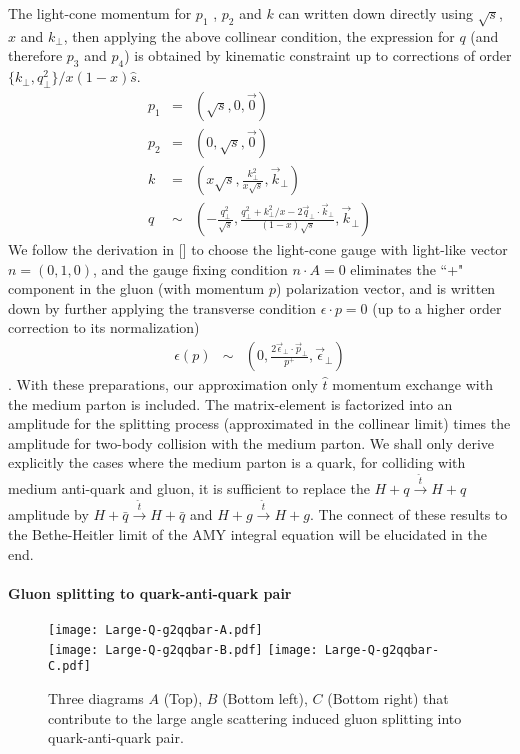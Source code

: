 The light-cone momentum for $p_1$ , $p_2$ and $k$ can written down directly using $\sqrt{s}$, $x$ and $k_\perp$, then applying the above collinear condition, the expression for $q$ (and therefore $p_3$ and $p_4$) is obtained by kinematic constraint up to corrections of order $\{k_\perp, q_\perp^2\}/x(1-x)\hat{s}$.
\begin{eqnarray}
p_1 &=& (\sqrt{s}, 0, \vec{0})\\
p_2 &=& (0, \sqrt{s}, \vec{0})\\
k &=& (x\sqrt{s}, \frac{k_\perp^2}{x\sqrt{s}}, \vec{k}_\perp)\\
q &\sim& (-\frac{q_\perp^2}{\sqrt{s}}, \frac{q_\perp^2 + k_\perp^2/x - 
2\vec{q}_\perp \cdot \vec{k}_\perp}{(1-x)\sqrt{s}}, \vec{k}_\perp)
\end{eqnarray}
We follow the derivation in [] to choose the light-cone gauge with light-like vector $n = (0, 1, 0)$, and the gauge fixing condition $n\cdot A =0$ eliminates the ``+" component in the gluon (with momentum $p$) polarization vector, and is written down by further applying the transverse condition $\epsilon \cdot p = 0$ (up to a higher order correction to its normalization)
\begin{eqnarray}
\epsilon(p) &\sim& (0, \frac{2\vec{\epsilon}_\perp\cdot\vec{p}_\perp}{p^+}, \vec{\epsilon}_\perp)
\end{eqnarray}.
With these preparations, our approximation only $\hat{t}$ momentum exchange with the medium parton is included.
The matrix-element is factorized into an amplitude for the splitting process (approximated in the collinear limit) times the amplitude for two-body collision with the medium parton.
We shall only derive explicitly the cases where the medium parton is a quark, for colliding with medium anti-quark and gluon, it is sufficient to replace the $H+q\xrightarrow{\hat{t}} H+q$ amplitude by $H+\bar{q}\xrightarrow{\hat{t}} H+\bar{q}$ and $H+g\xrightarrow{\hat{t}} H+g$.
The connect of these results to the Bethe-Heitler limit of the AMY integral equation will be elucidated in the end.

\paragraph*{Gluon splitting to quark-anti-quark pair}
\begin{figure}
\centering
\texttt{[image: Large-Q-g2qqbar-A.pdf]}\\
\vspace{1em}
\texttt{[image: Large-Q-g2qqbar-B.pdf]}\hfill
\texttt{[image: Large-Q-g2qqbar-C.pdf]}
\caption{Three diagrams $A$ (Top), $B$ (Bottom left), $C$ (Bottom right) that contribute to the large angle scattering induced gluon splitting into quark-anti-quark pair.}
\label{fig:feyn-g2qqbar}
\end{figure}

